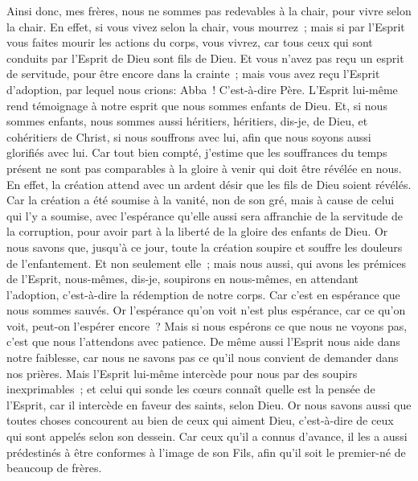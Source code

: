 \begin{multicols}{2}
Ainsi donc, mes frères, nous ne sommes pas redevables à la chair, pour vivre selon la chair.
En effet, si vous vivez selon la chair, vous mourrez~; mais si par l'Esprit vous faites mourir les actions du corps, vous vivrez,
car tous ceux qui sont conduits par l'Esprit de Dieu sont fils de Dieu.
Et vous n'avez pas reçu un esprit de servitude, pour être encore dans la crainte~; mais vous avez reçu l'Esprit d'adoption, par lequel nous crions: Abba~! C'est-à-dire Père.
L'Esprit lui-même rend témoignage à notre esprit que nous sommes enfants de Dieu.
Et, si nous sommes enfants, nous sommes aussi héritiers, héritiers, dis-je, de Dieu, et cohéritiers de Christ, si nous souffrons avec lui, afin que nous soyons aussi glorifiés avec lui.
Car tout bien compté, j'estime que les souffrances du temps présent ne sont pas comparables à la gloire à venir qui doit être révélée en nous.
En effet, la création attend avec un ardent désir que les fils de Dieu soient révélés.
Car la création a été soumise à la vanité, non de son gré, mais à cause de celui qui l'y a soumise,
avec l'espérance qu'elle aussi sera affranchie de la servitude de la corruption, pour avoir part à la liberté de la gloire des enfants de Dieu.
Or nous savons que, jusqu'à ce jour, toute la création soupire et souffre les douleurs de l'enfantement.
Et non seulement elle~; mais nous aussi, qui avons les prémices de l'Esprit, nous-mêmes, dis-je, soupirons en nous-mêmes, en attendant l'adoption, c'est-à-dire la rédemption de notre corps.
Car c'est en espérance que nous sommes sauvés. Or l'espérance qu'on voit n'est plus espérance, car ce qu'on voit, peut-on l'espérer encore~?
Mais si nous espérons ce que nous ne voyons pas, c'est que nous l'attendons avec patience.
De même aussi l'Esprit nous aide dans notre faiblesse, car nous ne savons pas ce qu'il nous convient de demander dans nos prières. Mais l'Esprit lui-même intercède pour nous par des soupirs inexprimables~;
et celui qui sonde les cœurs connaît quelle est la pensée de l'Esprit, car il intercède en faveur des saints, selon Dieu.
Or nous savons aussi que toutes choses concourent au bien de ceux qui aiment Dieu, c'est-à-dire de ceux qui sont appelés selon son dessein.
Car ceux qu'il a connus d'avance, il les a aussi prédestinés à être conformes à l'image de son Fils, afin qu'il soit le premier-né de beaucoup de frères.

\end{multicols}
